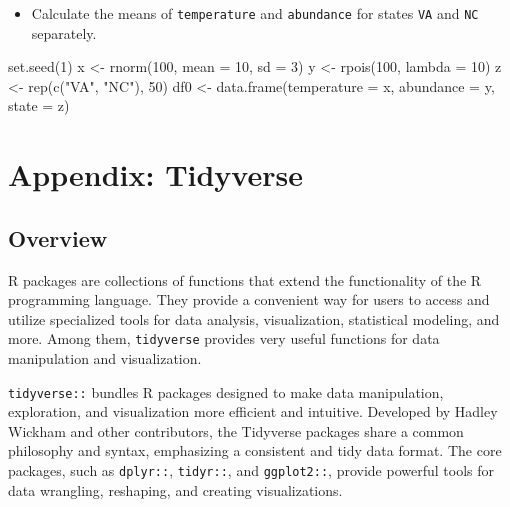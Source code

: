 \documentclass[
]{article}
\newenvironment{Shaded}{\begin{snugshade}}{\end{snugshade}}
\newcommand{\AttributeTok}[1]{\textcolor[rgb]{0.77,0.63,0.00}{#1}}
\newcommand{\DecValTok}[1]{\textcolor[rgb]{0.00,0.00,0.81}{#1}}
\newcommand{\FunctionTok}[1]{\textcolor[rgb]{0.00,0.00,0.00}{#1}}
\newcommand{\NormalTok}[1]{#1}
\newcommand{\OtherTok}[1]{\textcolor[rgb]{0.56,0.35,0.01}{#1}}
\newcommand{\StringTok}[1]{\textcolor[rgb]{0.31,0.60,0.02}{#1}}
\providecommand{\tightlist}{%
  \setlength{\itemsep}{0pt}\setlength{\parskip}{0pt}}
\begin{document}
\begin{itemize}
\tightlist
\item
  Calculate the means of \texttt{temperature} and \texttt{abundance} for states \texttt{VA} and \texttt{NC} separately.
\end{itemize}

\begin{Shaded}
\begin{Highlighting}[]
\FunctionTok{set.seed}\NormalTok{(}\DecValTok{1}\NormalTok{)}
\NormalTok{x }\OtherTok{\textless{}{-}} \FunctionTok{rnorm}\NormalTok{(}\DecValTok{100}\NormalTok{, }\AttributeTok{mean =} \DecValTok{10}\NormalTok{, }\AttributeTok{sd =} \DecValTok{3}\NormalTok{)}
\NormalTok{y }\OtherTok{\textless{}{-}} \FunctionTok{rpois}\NormalTok{(}\DecValTok{100}\NormalTok{, }\AttributeTok{lambda =} \DecValTok{10}\NormalTok{)}
\NormalTok{z }\OtherTok{\textless{}{-}} \FunctionTok{rep}\NormalTok{(}\FunctionTok{c}\NormalTok{(}\StringTok{"VA"}\NormalTok{, }\StringTok{"NC"}\NormalTok{), }\DecValTok{50}\NormalTok{)}
\NormalTok{df0 }\OtherTok{\textless{}{-}} \FunctionTok{data.frame}\NormalTok{(}\AttributeTok{temperature =}\NormalTok{ x, }\AttributeTok{abundance =}\NormalTok{ y, }\AttributeTok{state =}\NormalTok{ z)}
\end{Highlighting}
\end{Shaded}

\hypertarget{appendix-tidyverse}{%
\section{Appendix: Tidyverse}\label{appendix-tidyverse}}

\hypertarget{overview-1}{%
\subsection{Overview}\label{overview-1}}

R packages are collections of functions that extend the functionality of the R programming language. They provide a convenient way for users to access and utilize specialized tools for data analysis, visualization, statistical modeling, and more. Among them, \texttt{tidyverse} provides very useful functions for data manipulation and visualization.

\texttt{tidyverse::} bundles R packages designed to make data manipulation, exploration, and visualization more efficient and intuitive. Developed by Hadley Wickham and other contributors, the Tidyverse packages share a common philosophy and syntax, emphasizing a consistent and tidy data format. The core packages, such as \texttt{dplyr::}, \texttt{tidyr::}, and \texttt{ggplot2::}, provide powerful tools for data wrangling, reshaping, and creating visualizations.
\end{document}
